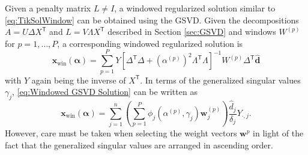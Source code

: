 \documentclass[12pt]{article}
\newcommand{\dVec}{\mathbf{d}}	%
\newcommand{\xVec}{\mathbf{x}}	%
\newcommand{\wVec}{\mathbf{w}}	%
\newcommand{\trans}[1]{{#1}^\mathsf{T}}	%
\newcommand{\inv}[1]{{#1}^{-1}}	%
\newcommand{\dft}[1]{\widehat{#1}}	%
\newcommand{\regparam}{\alpha}  %
\newcommand{\regparamVec}{\bm{\regparam}}   %
\newcommand{\xWin}{\xVec_{\text{win}}}	%
\newcommand{\filt}{\phi}
\begin{document}
Given a penalty matrix $L \neq I$, a windowed regularized solution similar to \eqref{eq:TikSolWindow} can be obtained using the GSVD. Given the decompositions $A = U\Delta\trans{X}$ and $L = V\Lambda\trans{X}$ described in Section \ref{sec:GSVD} and windows $W^{(p)}$ for $p = 1,\ldots,P$, a corresponding windowed regularized solution is
\begin{equation}
\label{eq:Windowed GSVD Solution}
    \xWin(\regparamVec) = \sum_{p=1}^P Y\inv{\left[\trans{\Delta}\Delta + \left(\regparam^{(p)}\right)^2 \trans{\Lambda}\Lambda\right]}W^{(p)}\trans{\Delta}\dft{\dVec}
\end{equation}
with $Y$ again being the inverse of $\trans{X}$. In terms of the generalized singular values $\gamma_j$, \eqref{eq:Windowed GSVD Solution} can be written as
\begin{equation}
\label{eq:Windowed GSVD Solution Sum}
    \xWin(\regparamVec) = \sum_{j=1}^n \left(\sum_{p=1}^P \filt_j\left(\regparam^{(p)},\gamma_j\right)\wVec^{(p)}_{j}\right)  \frac{\dft{d}_{j}}{\delta_j} Y_{\cdot,j}.
\end{equation}
However, care must be taken when selecting the weight vectors $\wVec^{p}$ in light of the fact that the generalized singular values are arranged in ascending order.
\end{document}
